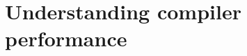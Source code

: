 



\chapter{Understanding compiler performance}
\label{chap:understanding-compiler-performance}




